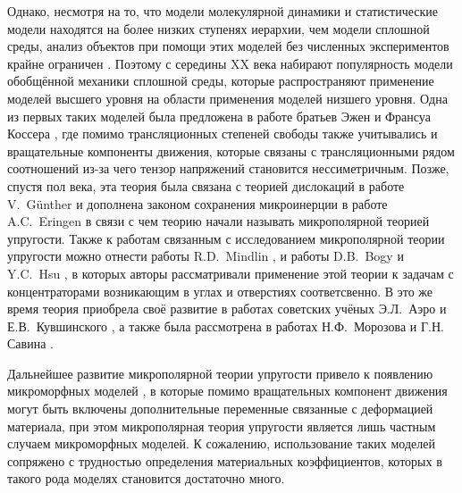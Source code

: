 Однако, несмотря на то, что модели молекулярной динамики и статистические модели находятся на более низких ступенях иерархии, чем модели сплошной среды, анализ объектов при помощи этих моделей без численных экспериментов крайне ограничен \cite{MDExperiment}. Поэтому с середины XX века набирают популярность модели обобщённой механики сплошной среды, которые распространяют применение моделей высшего уровня на области применения моделей низшего уровня. Одна из первых таких моделей была предложена в работе братьев Эжен и Франсуа Коссера \cite{Cosserat}, где помимо трансляционных степеней свободы также учитывались и вращательные компоненты движения, которые связаны с трансляционными рядом соотношений из-за чего тензор напряжений становится нессиметричным. Позже, спустя пол века, эта теория была связана с теорией дислокаций в работе V.~G{\"u}nther \cite{CosseratAndDislocation} и дополнена законом сохранения микроинерции в работе A.C.~Eringen \cite{Eringen2, Eringen3} в связи с чем теорию начали называть микрополярной теорией упругости. Также к работам связанным с исследованием микрополярной теории упругости можно отнести работы R.D.~Mindlin \cite{Mindlin1, Mindlin2, Mindlin3}, и работы D.B.~Bogy \cite{Bogy} и Y.C.~Hsu \cite{Hsu}, в которых авторы рассматривали применение этой теории к задачам с концентраторами возникающим в углах и отверстиях соответсвенно. В это же время теория приобрела своё развитие в работах советских учёных Э.Л.~Аэро и Е.В.~Кувшинского \cite{Aero1,Aero2}, а также была рассмотрена в работах Н.Ф.~Морозова \cite{Morozov} и Г.Н. Савина \cite{Savin}.

Дальнейшее развитие микрополярной теории упругости привело к появлению микроморфных моделей \cite{Eringen4, Micromorph1, Micromorph2}, в которые помимо вращательных компонент движения могут быть включены дополнительные переменные связанные с деформацией материала, при этом микрополярная теория упругости является лишь частным случаем микроморфных моделей. К сожалению, использование таких моделей сопряжено с трудностью определения материальных коэффициентов, которых в такого рода моделях становится достаточно много.

